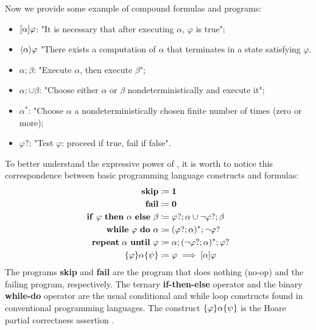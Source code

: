\begin{example}
	Now we provide some example of compound formulas and programs:
	\begin{itemize}
		\item $[\alpha]\varphi$: "It is necessary that after executing $\alpha$, $\varphi$ is true";
		\item $\langle \alpha \rangle\varphi$ "There exists a computation of $\alpha$ that terminates in a state satisfying $\varphi$.
		\item $\alpha;\beta$: "Execute $\alpha$, then execute $\beta$";
		\item $\alpha; \cup \beta$: "Choose either $\alpha$ or $\beta$ nondeterministically and execute it";
		\item $\alpha^*$: "Choose $\alpha$ a nondeterministically chosen finite number of times (zero or more);
		\item $\varphi?$: "Test $\varphi$: proceed if true, fail if false".
	\end{itemize}
\end{example}

\begin{example}
	To better understand the expressive power of \PDL, it is worth to notice this correspondence between basic programming language constructs and \PDL formulas:
	\begin{align*}
		\mathbf{skip} &\coloneqq \mathbf{1} \\
		\mathbf{fail} &\coloneqq \mathbf{0} \\
		\mathbf{if\ \varphi\ then\ \alpha\ else\ \beta} &\coloneqq \varphi?;\alpha \cup \lnot \varphi?;\beta \\
		\mathbf{while\ \varphi\ do\ \alpha} &\coloneqq (\varphi?;\alpha)^*;\lnot\varphi?\\
		\mathbf{repeat\ \alpha\ until\ \varphi} &\coloneqq \alpha;(\lnot\varphi?;\alpha)^*;\varphi?\\
		\{\varphi\} \alpha \{\psi\} &\coloneqq \varphi \implies [\alpha]\varphi\\
	\end{align*}
	The programs \textbf{skip} and \textbf{fail} are the program that does nothing (no-op) and the failing program, respectively. The ternary \textbf{if-then-else} operator and the binary \textbf{while-do} operator are the usual conditional and while loop constructs found in conventional programming languages. The	construct $\{\varphi\} \alpha \{\psi\}$ is the Hoare partial correctness assertion \citep{4567894}.
\end{example}
